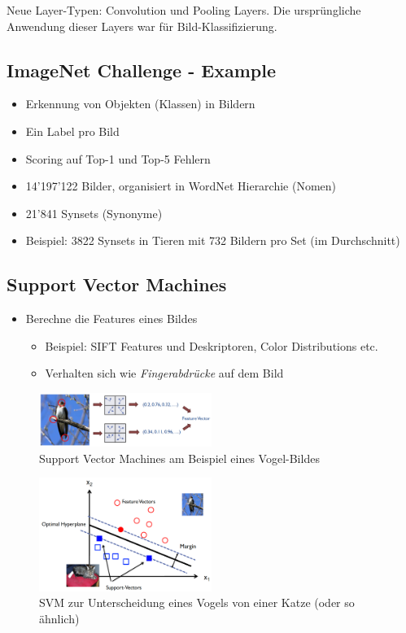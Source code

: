 \documentclass[a4paper]{article}
\begin{document}
		Neue Layer-Typen: Convolution und Pooling Layers.
		Die ursprüngliche Anwendung dieser Layers war für Bild-Klassifizierung.
		
		\subsection{ImageNet Challenge - Example}
		
		\begin{itemize}
			\item Erkennung von Objekten (Klassen) in Bildern
			\item Ein Label pro Bild
			\item Scoring auf Top-1 und Top-5 Fehlern
			\item 14'197'122 Bilder, organisiert in WordNet Hierarchie (Nomen)
			\item 21'841 Synsets (Synonyme)
			\item Beispiel: 3822 Synsets in Tieren mit 732 Bildern pro Set (im Durchschnitt)			
		\end{itemize}
	
		\subsection{Support Vector Machines}
		
		\begin{itemize}
			\item Berechne die Features eines Bildes
				\begin{itemize}
					\item Beispiel: SIFT Features und Deskriptoren, Color Distributions etc.
					\item Verhalten sich wie \textit{Fingerabdrücke} auf dem Bild 
				\end{itemize}
		\end{itemize}
	
		\begin{figure}[htb!]
			\centering
			\includegraphics[width=0.5\textwidth]{img/07_convolutional_nn/svm_bird_example.png}
			\caption{Support Vector Machines am Beispiel eines Vogel-Bildes}
		\end{figure}
	
		\begin{figure}[htb!]
			\centering
			\includegraphics[width=0.5\textwidth]{img/07_convolutional_nn/svm_example.png}
			\caption{SVM zur Unterscheidung eines Vogels von einer Katze (oder so ähnlich)}
		\end{figure}
	
\end{document}
